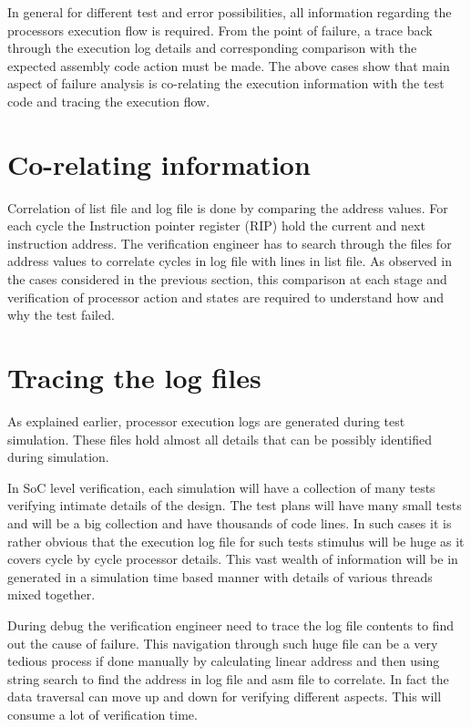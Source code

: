 In general for different test and error possibilities, all information regarding the processors execution flow is required. From the point of failure, a trace back through the execution log details and corresponding comparison with the expected assembly code action must be made. 
The above cases show that main aspect of failure analysis is co-relating the execution information with the test code and tracing the execution flow. 

\section{Co-relating information}

Correlation of list file and log file is done by comparing the address values. For each cycle the Instruction pointer register (RIP) hold the current and next instruction address. The verification engineer has to search through the files for address values to correlate cycles in log file with lines in list file. As observed in the cases considered in the previous section, this comparison at each stage and verification of processor action and states are required to understand how and why the test failed.

\section{Tracing the log files}
 
As explained earlier, processor execution logs are generated during test simulation. These files hold almost all details that can be possibly identified during simulation. 

In SoC level verification, each simulation will have a collection of many tests verifying intimate details of the design. The test plans will have many small tests and will be a big collection and have thousands of code lines. 
In such cases it is rather obvious that the execution log file for such tests stimulus will be huge as it covers cycle by cycle processor details.  This vast wealth of information will be in generated in a simulation time based manner with details of various threads mixed together. 

During debug the verification engineer need to trace the log file contents to find out the cause of failure. This navigation through such huge file can be a very tedious process if done manually by calculating linear address and then using string search to find the address in log file and asm file to correlate.  In fact the data traversal can move up and down for verifying different aspects. This will consume a lot of verification time. 

